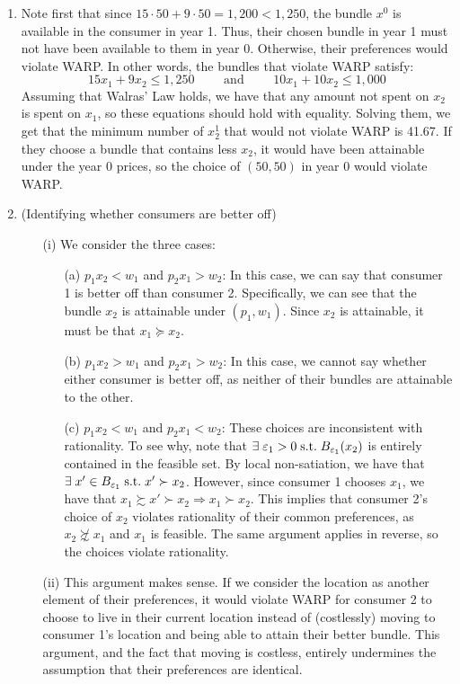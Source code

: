 \documentclass[12pt]{article}
\begin{document}
\begin{enumerate}
\item Note first that since $15 \cdot 50 + 9 \cdot 50 = 1,200 < 1,250$, the bundle $x^0$ is available in the consumer in year 1. Thus, their chosen bundle in year 1 must not have been available to them in year 0. Otherwise, their preferences would violate WARP. In other words, the bundles that violate WARP satisfy:
\[
15 x_1 + 9 x_2 \le 1,250 \qquad \text{ and }\qquad 10x_1 + 10x_2 \le 1,000
\]
Assuming that Walras' Law holds, we have that any amount not spent on $x_2$ is spent on $x_1$, so these equations should hold with equality. Solving them, we get that the minimum number of $x^1_2$ that would not violate WARP is 41.67. If they choose a bundle that contains less $x_2$, it would have been attainable under the year 0 prices, so the choice of $(50,50)$ in year 0 would violate WARP. 

\item (Identifying whether consumers are better off)

\begin{itemize}
	\item[(i)] We consider the three cases:
	\begin{itemize}
		\item[(a)] $p_1x_2 < w_1$ and $p_2 x_1 > w_2$: In this case, we can say that consumer 1 is better off than consumer 2. Specifically, we can see that the bundle $x_2$ is attainable under $(p_1,w_1)$. Since $x_2$ is attainable, it must be that $x_1 \succeq x_2$.
		
		\item[(b)] $p_1x_2 > w_1$ and $p_2 x_1 > w_2$: In this case, we cannot say whether either consumer is better off, as neither of their bundles are attainable to the other. 
		
		\item[(c)] $p_1x_2 < w_1$ and $p_2 x_1 < w_2$: These choices are inconsistent with rationality. To see why, note that $\exists \varepsilon_1 > 0 \st B_{\varepsilon_1}(x_2)$ is entirely contained in the feasible set. By local non-satiation, we have that $\exists x' \in B_{\varepsilon_1} \st x' \succ x_2$. However, since consumer 1 chooses $x_1$, we have that $x_1 \succsim x' \succ x_2 \Rightarrow x_1 \succ x_2$. This implies that consumer 2's choice of $x_2$ violates rationality of their common preferences, as $x_2 \not\succsim x_1$ and $x_1$ is feasible. The same argument applies in reverse, so the choices violate rationality.
	\end{itemize}
	\item[(ii)] This argument makes sense. If we consider the location as another element of their preferences, it would violate WARP for consumer 2 to choose to live in their current location instead of (costlessly) moving to consumer 1's location and being able to attain their better bundle. This argument, and the fact that moving is costless, entirely undermines the assumption that their preferences are identical. 
\end{itemize}
\end{enumerate}
\end{document}
